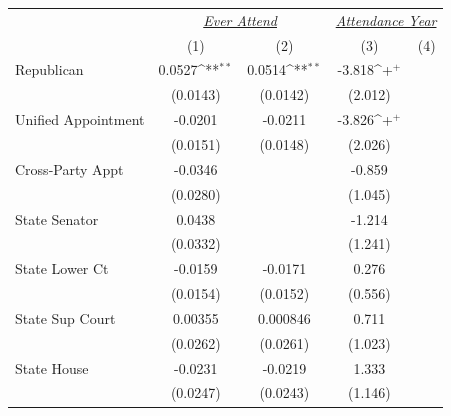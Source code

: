 {
\def\sym#1{\ifmmode^{#1}\else\(^{#1}\)\fi}
\begin{tabular}{l*{4}{c}}
\toprule
                    &\multicolumn{2}{c}{\uline{\textit{Ever Attend}}}&\multicolumn{2}{c}{\uline{\textit{Attendance Year}}}\\
                    &\multicolumn{1}{c}{(1)}        &\multicolumn{1}{c}{(2)}        &\multicolumn{1}{c}{(3)}        &\multicolumn{1}{c}{(4)}        \\
\midrule
Republican          &      0.0527\sym{**}&      0.0514\sym{**}&      -3.818\sym{+} &                    \\
                    &    (0.0143)        &    (0.0142)        &     (2.012)        &                    \\
\addlinespace
Unified Appointment &     -0.0201        &     -0.0211        &      -3.826\sym{+} &                    \\
                    &    (0.0151)        &    (0.0148)        &     (2.026)        &                    \\
\addlinespace
Cross-Party Appt    &     -0.0346        &                    &      -0.859        &                    \\
                    &    (0.0280)        &                    &     (1.045)        &                    \\
\addlinespace
State Senator       &      0.0438        &                    &      -1.214        &                    \\
                    &    (0.0332)        &                    &     (1.241)        &                    \\
\addlinespace
State Lower Ct      &     -0.0159        &     -0.0171        &       0.276        &                    \\
                    &    (0.0154)        &    (0.0152)        &     (0.556)        &                    \\
\addlinespace
State Sup Court     &     0.00355        &    0.000846        &       0.711        &                    \\
                    &    (0.0262)        &    (0.0261)        &     (1.023)        &                    \\
\addlinespace
State House         &     -0.0231        &     -0.0219        &       1.333        &                    \\
                    &    (0.0247)        &    (0.0243)        &     (1.146)        &                    \\

\end{tabular}}

